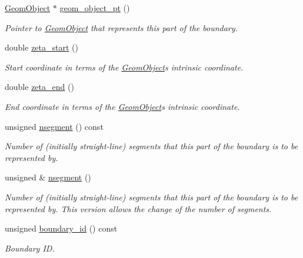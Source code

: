 \begin{DoxyCompactItemize}
\hyperlink{classoomph_1_1GeomObject}{Geom\+Object} $\ast$ \hyperlink{classoomph_1_1TriangleMeshCurviLine_a037242aaee2ba082658f87db87f6ef69}{geom\+\_\+object\+\_\+pt} ()
\begin{DoxyCompactList}\small\item\em Pointer to \hyperlink{classoomph_1_1GeomObject}{Geom\+Object} that represents this part of the boundary. \end{DoxyCompactList}\item 
double \hyperlink{classoomph_1_1TriangleMeshCurviLine_a6c0067c06cce020c85e3fe9b1737ce57}{zeta\+\_\+start} ()
\begin{DoxyCompactList}\small\item\em Start coordinate in terms of the \hyperlink{classoomph_1_1GeomObject}{Geom\+Object}\textquotesingle{}s intrinsic coordinate. \end{DoxyCompactList}\item 
double \hyperlink{classoomph_1_1TriangleMeshCurviLine_acecf95595d14b777bf6ac2ddd9327f8b}{zeta\+\_\+end} ()
\begin{DoxyCompactList}\small\item\em End coordinate in terms of the \hyperlink{classoomph_1_1GeomObject}{Geom\+Object}\textquotesingle{}s intrinsic coordinate. \end{DoxyCompactList}\item 
unsigned \hyperlink{classoomph_1_1TriangleMeshCurviLine_af5ee48a8cb78c2c2954a14241b5b1489}{nsegment} () const
\begin{DoxyCompactList}\small\item\em Number of (initially straight-\/line) segments that this part of the boundary is to be represented by. \end{DoxyCompactList}\item 
unsigned \& \hyperlink{classoomph_1_1TriangleMeshCurviLine_a2f5337ebf1926262541b708799a597fa}{nsegment} ()
\begin{DoxyCompactList}\small\item\em Number of (initially straight-\/line) segments that this part of the boundary is to be represented by. This version allows the change of the number of segments. \end{DoxyCompactList}\item 
unsigned \hyperlink{classoomph_1_1TriangleMeshCurviLine_acb7ae5fdae67480a0e797da29d518aee}{boundary\+\_\+id} () const
\begin{DoxyCompactList}\small\item\em Boundary ID. \end{DoxyCompactList}\item 

\end{DoxyCompactItemize}
